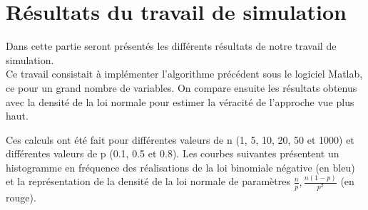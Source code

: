 \documentclass{article}
\begin{document}
\section{Résultats du travail de simulation}

Dans cette partie seront présentés les différents résultats de notre travail de simulation.\\
Ce travail consistait à implémenter l'algorithme précédent sous le logiciel Matlab, ce pour un grand nombre de variables. On compare ensuite les résultats obtenus avec la densité de la loi normale pour estimer la véracité de l'approche vue plus haut.

\bigskip
Ces calculs ont été fait pour différentes valeurs de n (1, 5, 10, 20, 50 et 1000) et différentes valeurs de p (0.1, 0.5 et 0.8). Les courbes suivantes présentent un histogramme en fréquence des réalisations de la loi binomiale négative (en bleu) et la représentation de la densité de la loi normale de paramètres $\frac{n}{p},\frac{n(1-p)}{p^2}$ (en rouge).
\end{document}
